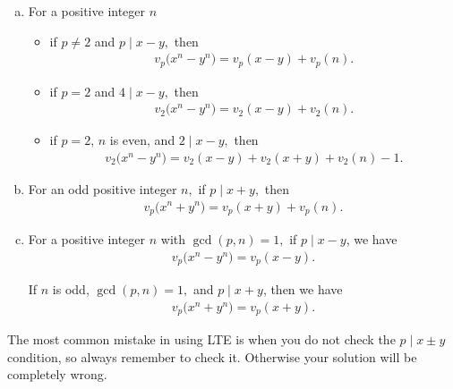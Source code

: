 \documentclass[main.tex]{subfile}
\begin{document}
    \begin{enumerate}[(a)]
        \item  For a positive integer $n$ 
            \begin{itemize}
                \item if $p \neq 2$ and $p \mid x-y,$ then
                 \begin{align*}
                 v_p\big(  x^n - y^n \big) = v_p(  x - y ) + v_p(  n ).
                 \end{align*}
            
                \item if $p=2$ and $4 \mid x-y,$ then
                \begin{align*}
                 v_2\big(  x^n - y^n \big) = v_2(  x-y ) + v_2(  n ).
                \end{align*}
            
                \item if $p=2$, $n$ is even, and $2\mid x-y,$ then
                \begin{align*}
                v_2\big(  x^n - y^n \big) = v_2(  x - y )+v_2(  x + y )+v_2(  n )-1.
                \end{align*}
            \end{itemize}
    
        \item For an odd positive integer $n,$ if $p \mid x+y,$ then
	            \begin{align*}
                 v_p\big(  x^n + y^n \big) = v_p(  x + y ) + v_p(  n ).
                 \end{align*}
    
        \item For a positive integer $n$ with $\gcd(p,n)=1,$ if $p\mid x-y$, we have
         \begin{align*}
         v_p\big(  x^n - y^n \big) = v_p(  x - y )  .
         \end{align*}
        \par If $n$ is odd, $\gcd(p,n)=1,$ and $p\mid x+y$, then we have
		\begin{align*}
		v_p\big(  x^n + y^n \big) = v_p(  x + y )  .
		\end{align*}
    
    \end{enumerate}

    \begin{note}
        The most common mistake in using LTE is when you do not check the $p \mid x \pm y$ condition, so always remember to check it. Otherwise your solution will be completely wrong.
    \end{note}
\end{document}
